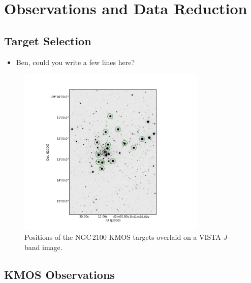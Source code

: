\documentclass[useAMS,usenatbib]{mn2e}
\begin{document}








\section{Observations and Data Reduction} %
\label{sec:observations}
\subsection{Target Selection} %
\label{sub:target_selection}

\begin{itemize}
  \item Ben, could you write a few lines here?
\end{itemize}

\begin{figure}
 \includegraphics[width=9.0cm]{NGC2100-targets}
 \caption{Positions of the NGC\,2100 KMOS targets overlaid on a VISTA $J$-band image.
\label{fig:targets}
          }
\end{figure}

\subsection{KMOS Observations} %
\label{sub:kmos_observations}
\end{document}
